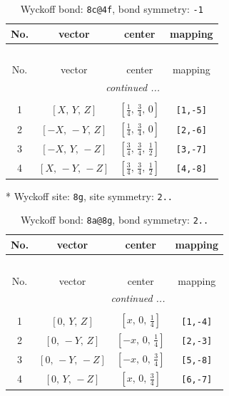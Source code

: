 \documentclass[fleqn,8pt]{jsarticle}
\begin{document}
\begin{longtable}{cccc}
\caption{Wyckoff bond: {\tt 8c@4f}, bond symmetry: {\tt -1}}
 \\
 \hline \hline
No. & vector & center & mapping \\ \hline \endfirsthead

\multicolumn{3}{l}{\tablename\ \thetable{}} \\
 \hline \hline
No. & vector & center & mapping \\ \hline \endhead

 \hline \hline
\multicolumn{3}{r}{\footnotesize\it continued ...} \\ \endfoot

 \hline \hline
\multicolumn{3}{r}{} \\ \endlastfoot

1 & $\left[ X,\, Y,\, Z \right]$ & $\left[ \frac{1}{4},\, \frac{3}{4},\, 0 \right]$ & {\tt [1,-5]} \\ \hline
2 & $\left[ - X,\, - Y,\, Z \right]$ & $\left[ \frac{1}{4},\, \frac{3}{4},\, 0 \right]$ & {\tt [2,-6]} \\ \hline
3 & $\left[ - X,\, Y,\, - Z \right]$ & $\left[ \frac{3}{4},\, \frac{3}{4},\, \frac{1}{2} \right]$ & {\tt [3,-7]} \\ \hline
4 & $\left[ X,\, - Y,\, - Z \right]$ & $\left[ \frac{3}{4},\, \frac{3}{4},\, \frac{1}{2} \right]$ & {\tt [4,-8]} \\
\end{longtable}
* Wyckoff site: {\tt 8g}, site symmetry: {\tt 2..}
\renewcommand{\arraystretch}{1.2}
\begin{longtable}{cccc}
\caption{Wyckoff bond: {\tt 8a@8g}, bond symmetry: {\tt 2..}}
 \\
 \hline \hline
No. & vector & center & mapping \\ \hline \endfirsthead

\multicolumn{3}{l}{\tablename\ \thetable{}} \\
 \hline \hline
No. & vector & center & mapping \\ \hline \endhead

 \hline \hline
\multicolumn{3}{r}{\footnotesize\it continued ...} \\ \endfoot

 \hline \hline
\multicolumn{3}{r}{} \\ \endlastfoot

1 & $\left[ 0,\, Y,\, Z \right]$ & $\left[ x,\, 0,\, \frac{1}{4} \right]$ & {\tt [1,-4]} \\ \hline
2 & $\left[ 0,\, - Y,\, Z \right]$ & $\left[ - x,\, 0,\, \frac{1}{4} \right]$ & {\tt [2,-3]} \\ \hline
3 & $\left[ 0,\, - Y,\, - Z \right]$ & $\left[ - x,\, 0,\, \frac{3}{4} \right]$ & {\tt [5,-8]} \\ \hline
4 & $\left[ 0,\, Y,\, - Z \right]$ & $\left[ x,\, 0,\, \frac{3}{4} \right]$ & {\tt [6,-7]} \\
\end{longtable}
\end{document}
